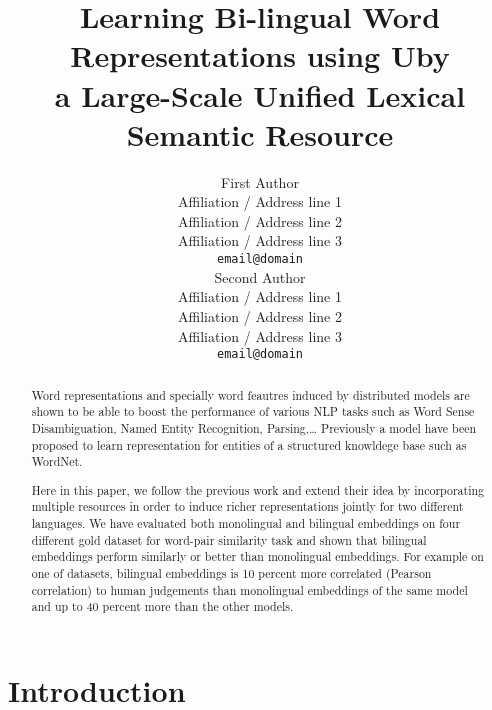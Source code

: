 \documentclass[11pt]{article}
\title{Learning Bi-lingual Word Representations using Uby \\a Large-Scale Unified
Lexical Semantic Resource}
\author{First Author \\
  Affiliation / Address line 1 \\
  Affiliation / Address line 2 \\
  Affiliation / Address line 3 \\
  {\tt email@domain} \\\And
  Second Author \\
  Affiliation / Address line 1 \\
  Affiliation / Address line 2 \\
  Affiliation / Address line 3 \\
  {\tt email@domain} \\}
\date{}
\begin{document}
\maketitle
\begin{abstract}
  Word representations and specially word feautres induced by distributed models
  are shown to be able to boost the performance of various NLP tasks such as
  Word Sense Disambiguation, Named Entity Recognition, Parsing,\ldots
  Previously a model have been proposed  to learn
  representation for entities of a structured knowldege base such as WordNet.
  
  Here in this paper, we follow the previous work and extend their idea by
  incorporating multiple resources  in order to induce richer representations jointly for two different languages.  
  We have evaluated both monolingual  and bilingual embeddings on four different gold dataset
for word-pair similarity task and shown that bilingual embeddings perform similarly or better than monolingual embeddings. 
For example on one of datasets, bilingual embeddings is 10 percent more correlated (Pearson correlation) to human judgements  than 
monolingual embeddings of the same model and up to 40 percent more than the other models.

\end{abstract}


\section{Introduction}
\end{document}
